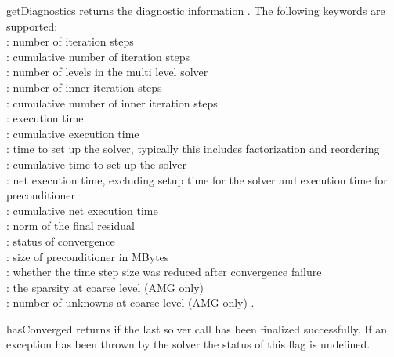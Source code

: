 \begin{methoddesc}[SolverOptions]{getDiagnostics}{}
returns the diagnostic information . The following keywords are
supported:\\
 : number of iteration steps\\
 : cumulative number of iteration steps\\
 : number of levels in the multi level solver\\
 : number of inner iteration steps\\
 : cumulative number of inner iteration steps\\
 : execution time\\
 : cumulative execution time\\
 : time to set up the solver, typically this includes
 factorization and reordering\\
 : cumulative time to set up the solver\\
 : net execution time, excluding setup time for the solver
 and execution time for preconditioner\\
 : cumulative net execution time\\
 : norm of the final residual\\
 : status of convergence\\
 : size of preconditioner in MBytes \\
 : whether the time step size was reduced after convergence failure \\
 : the sparsity at coarse level (AMG only) \\
 : number of unknowns at coarse level (AMG only) .
 
\end{methoddesc}

\begin{methoddesc}[SolverOptions]{hasConverged}{}
returns \True if the last solver call has been finalized successfully.
If an exception has been thrown by the solver the status of this flag is undefined.
\end{methoddesc}


